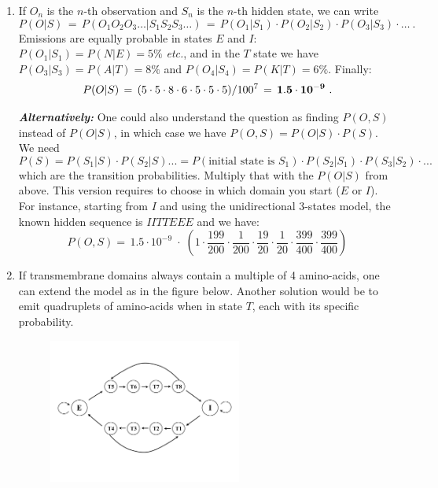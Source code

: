\documentclass[a4paper,11pt]{article}
\begin{document}
\begin{enumerate}
\item If $O_n$ is the $n$-th observation and $S_n$ is the $n$-th
  hidden state, we can write 
$$
P(O|S)
\, =\, P(O_1O_2O_3\dots | S_1S_2S_3\dots)
\, =\, P(O_1|S_1)\cdot P(O_2|S_2)\cdot P(O_3|S_3)\cdot \dots~.
$$
Emissions are equally probable in states $E$ and $I$: $P(O_1|S_1) =
P(N|E) = 5\%$ \textit{etc.}, and in the $T$ state we have
$P(O_3|S_3) = P(A|T) = 8\%$ and $P(O_4|S_4) = P(K|T) = 6\%$.
Finally:
$$
P(O|S)\, = \,(5\cdot 5\cdot 8\cdot 6\cdot 5\cdot 5\cdot 5) / 100^{7}\,
=\, \bf{1.5\cdot 10^{-9}}~.
$$

\textbf{\textit{Alternatively:}} One could also understand the question as finding $P(O,S)$ instead of $P(O|S)$, in which case 
we have $P(O,S) = P(O|S)\cdot P(S) $. We need 
$$
P(S) = P(S_1|S)\cdot P(S_2|S) ... = P(\text{initial state is } S_1)\cdot P(S_2|S_1) \cdot P(S_3|S_2)\cdot ...  
$$
which are the transition probabilities. Multiply that with the $P(O|S)$ from above. This version requires to choose
in which domain you start ($E$ or $I$). For instance, starting from $I$ and using the unidirectional 3-states model,
the known hidden sequence is $IITTEEE$ and we have:
$$
P(O,S) = \,1.5\cdot 10^{-9}\; \cdot \; (1\cdot \frac{199}{200}\cdot \frac{1}{200}\cdot \frac{19}{20}\cdot \frac{1}{20}
\cdot \frac{399}{400}\cdot \frac{399}{400})
$$

\item If transmembrane domains always contain a multiple of 4 amino-acids, one can extend the model as in the figure below.
Another solution would be to emit quadruplets of amino-acids when in state $T$, each with its specific probability.

\begin{figure}[hbt]
\centering
\includegraphics[width=0.6\textwidth]{hmm_graph3.pdf}
\end{figure}

\end{enumerate}
\end{document}
